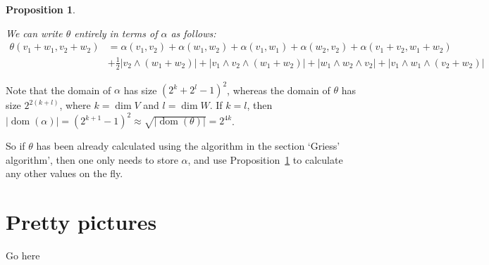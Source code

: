 \documentclass[a4paper,debug]{tufte-handout}
\DeclareMathOperator{\dom}{dom}
\theoremstyle{plain}
\newtheorem{proposition}[theorem]{Proposition}
\theoremstyle{definition}
\theoremstyle{remark}
\begin{document}
\begin{proposition}\label{eq:reconstructing theta}

We can write $\theta$ entirely in terms of $\alpha$ as follows:
\begin{align*}
	\theta(v_1+w_1,v_2+w_2)	& = \alpha(v_1,v_2)  + \alpha(w_1,w_2) + \alpha(v_1,w_1) + \alpha(w_2,v_2) + \alpha(v_1+v_2,w_1+w_2)\\
							& + \frac12|v_2\wedge(w_1+w_2)| + |v_1\wedge v_2 \wedge (w_1+w_2)| + |w_1\wedge w_2 \wedge v_2| + |v_1\wedge w_1 \wedge (v_2 + w_2)| 
\end{align*}
\end{proposition}

Note that the domain of $\alpha$ has size $(2^k + 2^l - 1)^2$, whereas the domain of $\theta$ has size $2^{2(k+l)}$, where $k=\dim V$ and $l=\dim W$.
If $k=l$, then $|\dom(\alpha)| = (2^{k+1}-1)^2 \approx \sqrt{|\dom(\theta)|} = 2^{4k}$.

So if $\theta$ has been already calculated using the algorithm in the section `Griess' algorithm', then one only needs to store $\alpha$, and use Proposition~\ref{eq:reconstructing theta} to calculate any other values on the fly.

\section{Pretty pictures}

Go here



\end{document}
